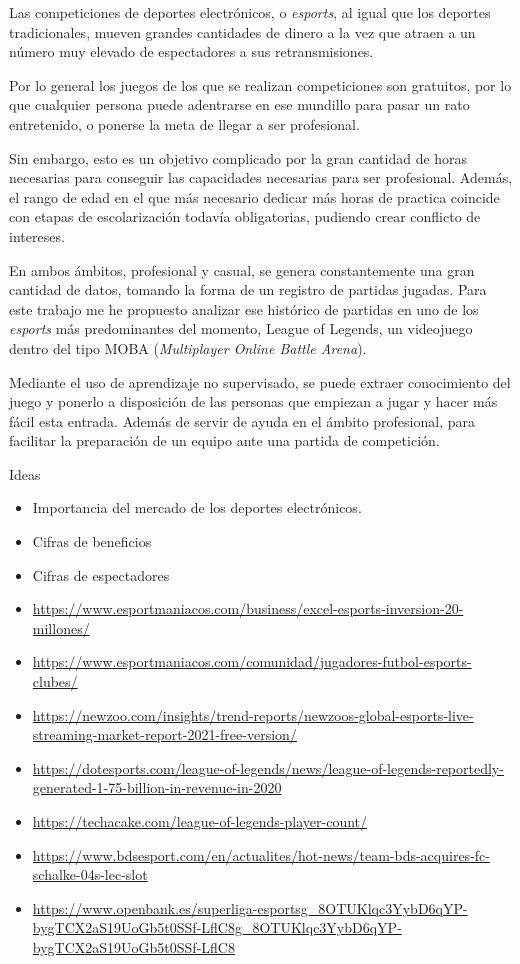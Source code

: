 
Las competiciones de deportes electrónicos, o \textit{esports}, al igual que los deportes tradicionales, mueven grandes cantidades de dinero a la vez que atraen a un número muy elevado de espectadores a sus retransmisiones.

Por lo general los juegos de los que se realizan competiciones son gratuitos, por lo que cualquier persona puede adentrarse en ese mundillo para pasar un rato entretenido, o ponerse la meta de llegar a ser profesional.

Sin embargo, esto es un objetivo complicado por la gran cantidad de horas necesarias para conseguir las capacidades necesarias para ser profesional. Además, el rango de edad en el que más necesario dedicar más horas de practica coincide con etapas de escolarización todavía obligatorias, pudiendo crear conflicto de intereses.

En ambos ámbitos, profesional y casual, se genera constantemente una gran cantidad de datos, tomando la forma de un registro de partidas jugadas. Para este trabajo me he propuesto analizar ese histórico de partidas en uno de los \textit{esports} más predominantes del momento, League of Legends, un videojuego dentro del tipo MOBA (\textit{Multiplayer Online Battle Arena}).

Mediante el uso de aprendizaje no supervisado, se puede extraer conocimiento del juego y ponerlo a disposición de las personas que empiezan a jugar y hacer más fácil esta entrada. Además de servir de ayuda en el ámbito profesional, para facilitar la preparación de un equipo ante una partida de competición.

\hfill \break
Ideas
\sloppy
\begin{itemize}
    \item Importancia del mercado de los deportes electrónicos.
    \item Cifras de beneficios
    \item Cifras de espectadores
    \item \url{https://www.esportmaniacos.com/business/excel-esports-inversion-20-millones/}
    \item \url{https://www.esportmaniacos.com/comunidad/jugadores-futbol-esports-clubes/}
    \item \url{https://newzoo.com/insights/trend-reports/newzoos-global-esports-live-streaming-market-report-2021-free-version/}
    \item \url{https://dotesports.com/league-of-legends/news/league-of-legends-reportedly-generated-1-75-billion-in-revenue-in-2020}
    \item \url{https://techacake.com/league-of-legends-player-count/}
    \item \url{https://www.bdsesport.com/en/actualites/hot-news/team-bds-acquires-fc-schalke-04s-lec-slot}
    \item \url{https://www.openbank.es/superliga-esportsg_8OTUKlqc3YybD6qYP-bygTCX2aS19UoGb5t0SSf-LflC8g_8OTUKlqc3YybD6qYP-bygTCX2aS19UoGb5t0SSf-LflC8}
\end{itemize}